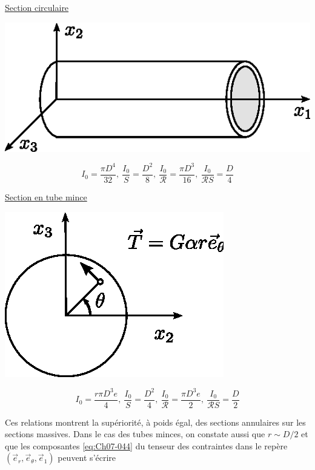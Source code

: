 \underline{Section circulaire}
\begin{multicols}{2}
    \begin{center}
        \includegraphics{../images/T1_Ch07-10}
    \end{center}
    \columnbreak
    \begin{displaymath}
        I_0 = \frac{\pi D^4}{32},\ \frac{I_0}{S} = \frac{D^2}{8},\ \frac{I_0}{\mathcal{R}} = \frac{\pi D^3}{16},\ \frac{I_0}{\mathcal{R} S} = \frac{D}{4}
    \end{displaymath}
\end{multicols}
\underline{Section en tube mince}
\begin{multicols}{2}
    \begin{center}
        \includegraphics{../images/T1_Ch07-11}
    \end{center}
    \columnbreak
    \begin{displaymath}
        I_0 = \frac{r\pi D^3 e}{4},\ \frac{I_0}{S} = \frac{D^2}{4},\ \frac{I_0}{\mathcal{R}} = \frac{\pi D^3 e}{2},\ \frac{I_0}{\mathcal{R} S} = \frac{D}{2}
    \end{displaymath}
\end{multicols}
Ces relations montrent la supériorité, à poids égal, des sections annulaires sur les sections massives.
Dans le cas des tubes minces, on constate aussi que $r \sim D/2$ et que les composantes \eqref{eq:Ch07-044} du tenseur des contraintes dans le repère $\left( \vec{e}_r, \vec{e}_{\theta}, \vec{e}_1 \right)$ peuvent s'écrire
